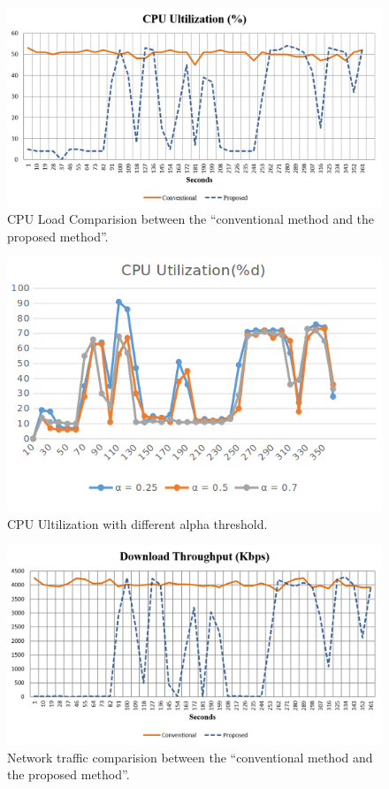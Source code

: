 \begin{figure}
\centering
\includegraphics[scale=0.7]{Figures/cpu.png}
\caption{CPU Load Comparision between the “conventional method and the proposed method”.}
\label{fig:cpu}
\end{figure}
\begin{figure}
\centering
\includegraphics[scale=0.7]{Figures/cpu_utilization.png}
\caption{CPU Ultilization with different alpha threshold.}
\label{fig:cpu_ultilization}
\end{figure}
\begin{figure}
\centering
\includegraphics[scale=0.7]{Figures/network.png}
\caption{Network traffic comparision between the “conventional method and the proposed method”.}
\label{fig:network}
\end{figure}
